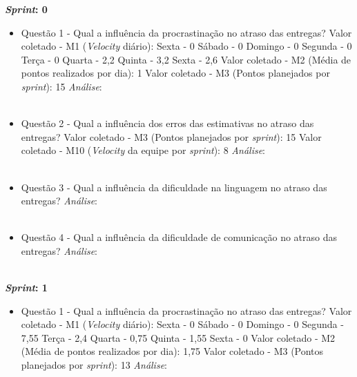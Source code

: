\begin{apendicesenv}
		    \vfill
	    \pagebreak

	\textbf{\textit{Sprint}: 0}
	
	\begin{itemize}
	  
	  \item Questão 1 - Qual a influência da procrastinação no atraso das entregas?
	    \subitem Valor coletado - M1 (\textit{Velocity} diário):
	      \subsubitem Sexta - 0
	      \subsubitem Sábado - 0
	      \subsubitem Domingo - 0
	      \subsubitem Segunda - 0
	      \subsubitem Terça - 0
	      \subsubitem Quarta - 2,2
	      \subsubitem Quinta - 3,2
	      \subsubitem Sexta - 2,6
	    \subitem Valor coletado - M2 (Média de pontos realizados por dia): 1
	    \subitem Valor coletado - M3 (Pontos planejados por \textit{sprint}): 15
	    \subitem \textit{Análise}:
	    \\
	    \\

	  \item Questão 2 - Qual a influência dos erros das estimativas no atraso das entregas? 
	    \subitem Valor coletado - M3 (Pontos planejados por \textit{sprint}): 15
	    \subitem Valor coletado - M10 (\textit{Velocity} da equipe por \textit{sprint}): 8
	    \subitem \textit{Análise}:
	    \\
	    \\
	    
	  \item Questão 3 - Qual a influência da dificuldade na linguagem no atraso das entregas?
	    \subitem \textit{Análise}:
	  \\
	  \\
	  
	  \item Questão 4 - Qual a influência da dificuldade de comunicação no atraso das entregas?
	    \subitem \textit{Análise}:
	  \\
	  \\
	  
	\end{itemize}
	    \vfill
	    \pagebreak
	\textbf{\textit{Sprint}: 1}
	
	\begin{itemize}
	  
	  \item Questão 1 - Qual a influência da procrastinação no atraso das entregas?
	    \subitem Valor coletado - M1 (\textit{Velocity} diário):
	      \subsubitem Sexta - 0
	      \subsubitem Sábado - 0
	      \subsubitem Domingo - 0
	      \subsubitem Segunda - 7,55
	      \subsubitem Terça - 2,4 
	      \subsubitem Quarta - 0,75 
	      \subsubitem Quinta - 1,55
	      \subsubitem Sexta - 0
	    \subitem Valor coletado - M2 (Média de pontos realizados por dia): 1,75
	    \subitem Valor coletado - M3 (Pontos planejados por \textit{sprint}): 13
	    \subitem \textit{Análise}:
	    \\
	    \\


\end{itemize}
\end{apendicesenv}
